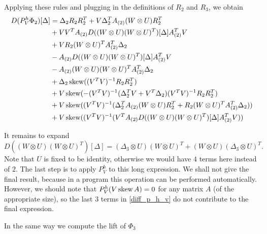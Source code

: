Applying these rules and plugging in the definitions of $R_2$ and $R_3$, we obtain
\begin{equation}
    \label{diff_p_h_v}
\begin{split}
 D(P^h_V \Phi_2) [ \Delta ]  &= \Delta_2 R_2 R_2^T + V \Delta_2^T A_{(2)} (W \otimes U) R_2^T \\ 
  & + V V^T A_{(2)} D ( ( W \otimes U)(W \otimes U)^T ) [\Delta] A_{(2)}^T V \\
 & + V R_2 (W \otimes U)^T A_{(2)}^T \Delta_2  \\
& - A_{(2)} D ( ( W \otimes U)(W \otimes U)^T ) [\Delta] A_{(2)}^T V \\
& -  A_{(2)}  ( W \otimes U)(W \otimes U)^T A_{(2)}^T \Delta_2 \\
& + \Delta_2 \operatorname*{skew} ( (V^T V)^{-1} R_2 R_2^T ) \\
& + V \operatorname*{skew} ( - (V^T V)^{-1} ( \Delta_2^T V + V^T \Delta_2) (V^T V)^{-1} R_2 R_2^T) \\ 
& +  V \operatorname*{skew} ( (V^T V)^{-1} ( \Delta_2^T A_{(2)} ( W \otimes U) R_2^T + R_2 (W \otimes U)^T A_{(2)}^T \Delta_2 ) ) \\
& +  V \operatorname*{skew} ( (V^T V)^{-1} ( V^T A_{(2)} D ( ( W \otimes U)(W \otimes U)^T)[\Delta]  A_{(2)}^T V ) ) \end{split}
\end{equation}

It remains to expand
\begin{equation}
D( ( W \otimes U)(W \otimes U)^T ) [\Delta] = ( \Delta_3 \otimes U) (W \otimes U)^T  + ( W \otimes U )( \Delta_3 \otimes U)^T. 
\end{equation}
Note that $U$ is fixed to be identity, otherwise we would have $4$ terms here instead of $2$.
The last step is to apply $P^h_V$ to this long expression. We shall not give the final result,
because in a program this operation can be performed automatically.
However, we should note that $P^h_V(V \operatorname*{skew} A) = 0$ for any matrix $A$ (of the appropriate size),
so the last $3$ terms in \eqref{diff_p_h_v} do not contribute to the final expression.

In the same way we compute the lift of $\Phi_3$

